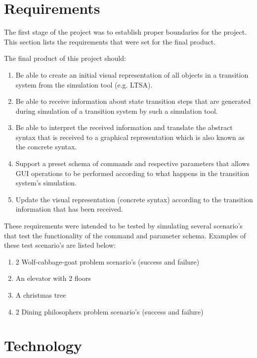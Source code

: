 \documentclass[11pt,a4paper]{article}
\begin{document}
\clearpage
\section{Requirements}

The first stage of the project was to establish proper boundaries for the project. This section lists the requirements that were set for the final product.

The final product of this project should:

\begin{enumerate}
	\item Be able to create an initial visual representation of all objects in a transition system from the simulation tool (e.g. LTSA).
	\item Be able to receive information about state transition steps that are generated during simulation of a transition system by such a simulation tool.
	\item Be able to interpret the received information and translate the abstract syntax that is received to a graphical representation which is also known as the concrete syntax.
	\item Support a preset schema of commands and respective parameters that allows GUI operations to be performed according to what happens in the transition system's simulation.
	\item Update the visual representation (concrete syntax) according to the transition information that has been received.
\end{enumerate}

These requirements were intended to be tested by simulating several scenario's that test the functionality of the command and parameter schema. Examples of these test scenario's are listed below:

\begin{enumerate}
	\item 2 Wolf-cabbage-goat problem scenario's (success and failure)
	\item An elevator with 2 floors
	\item A christmas tree
	\item 2 Dining philosophers problem scenario's  (success and failure)
\end{enumerate}

\clearpage
\section{Technology}
\end{document}
